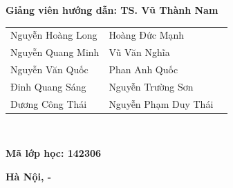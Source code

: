 \documentclass{article} %
\begin{document}
\begin{titlepage}
	\hspace{2.4cm}
	\begin{minipage}{0.8\textwidth}
		\textbf{Giảng viên hướng dẫn:          TS. Vũ Thành Nam} 
	\end{minipage}

	\hspace{3cm}
	\begin{minipage}{0.7\textwidth}
		\begin{tabular}{l l l}
			Nguyễn Hoàng Long & Hoàng Đức Mạnh       \\
			Nguyễn Quang Minh & Vũ Văn Nghĩa         \\
			Nguyễn Văn Quốc   & Phan Anh Quốc        \\
			Đinh Quang Sáng   & Nguyễn Trường Sơn    \\
			Dương Công Thái   & Nguyễn Phạm Duy Thái \\
		\end{tabular}
	\end{minipage} \\

	\hspace{2.4cm}
	\begin{minipage}{0.8\textwidth}
		\textbf{Mã lớp học: 142306}
	\end{minipage}

	\vspace{0.5cm}
	\begin{center}
		\textbf{Hà Nội, \the\month - \the\year}
	\end{center}
\end{titlepage}





\end{document}
